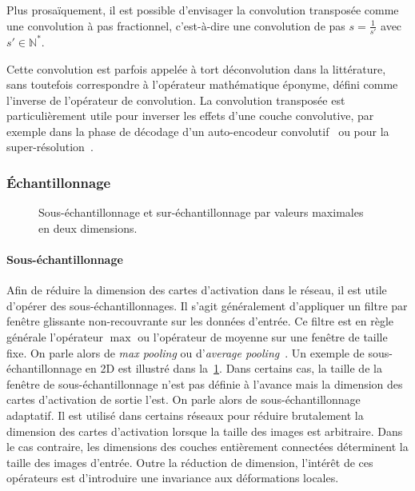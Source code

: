 Plus prosaïquement, il est possible d'envisager la convolution transposée comme une convolution à pas fractionnel, c'est-à-dire une convolution de pas $s = \frac{1}{s'}$ avec $s' \in \mathbb{N}^*$.

Cette convolution est parfois appelée à tort \og déconvolution \fg dans la littérature, sans toutefois correspondre à l'opérateur mathématique éponyme, défini comme l'inverse de l'opérateur de convolution. La convolution transposée est particulièrement utile pour inverser les effets d'une couche convolutive, par exemple dans la phase de décodage d'un auto-encodeur convolutif~\cite{zhao_stacked_2015} ou pour la super-résolution~\cite{dong_accelerating_2016}.

\subsubsection{Échantillonnage}

\begin{figure}
  \resizebox{\textwidth}{!}{
  
  }
  \caption{Sous-échantillonnage et sur-échantillonnage par valeurs maximales en deux dimensions.}
  \label{fig:pooling}
\end{figure}

\paragraph{Sous-échantillonnage}

Afin de réduire la dimension des cartes d'activation dans le réseau, il est utile d'opérer des sous-échantillonnages. Il s'agit généralement d'appliquer un filtre par fenêtre glissante non-recouvrante sur les données d'entrée. Ce filtre est en règle générale l'opérateur $\max$ ou l'opérateur de moyenne sur une fenêtre de taille fixe. On parle alors de \emph{max pooling} ou d'\emph{average pooling}~\cite{zhou_stereo_1988}. Un exemple de sous-échantillonnage en 2D est illustré dans la~\cref{fig:pooling}. Dans certains cas, la taille de la fenêtre de sous-échantillonnage n'est pas définie à l'avance mais la dimension des cartes d'activation de sortie l'est. On parle alors de sous-échantillonnage adaptatif. Il est utilisé dans certains réseaux pour réduire brutalement la dimension des cartes d'activation lorsque la taille des images est arbitraire. Dans le cas contraire, les dimensions des couches entièrement connectées déterminent la taille des images d'entrée. Outre la réduction de dimension, l'intérêt de ces opérateurs est d'introduire une invariance aux déformations locales.

